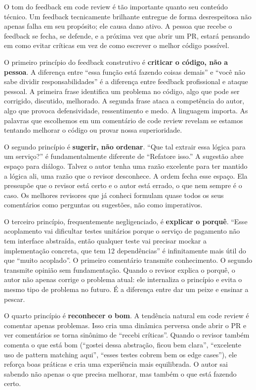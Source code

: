 O tom do feedback em code review é tão importante quanto seu conteúdo técnico. Um
feedback tecnicamente brilhante entregue de forma desrespeitosa não apenas falha em
seu propósito; ele causa dano ativo. A pessoa que recebe o feedback se fecha, se
defende, e a próxima vez que abrir um PR, estará pensando em como evitar críticas
em vez de como escrever o melhor código possível.

O primeiro princípio do feedback construtivo é \textbf{criticar o código, não a
pessoa}. A diferença entre ``essa função está fazendo coisas demais'' e ``você não
sabe dividir responsabilidades'' é a diferença entre feedback profissional e ataque
pessoal. A primeira frase identifica um problema no código, algo que pode ser
corrigido, discutido, melhorado. A segunda frase ataca a competência do autor,
algo que provoca defensividade, ressentimento e medo. A linguagem importa. As
palavras que escolhemos em um comentário de code review revelam se estamos tentando
melhorar o código ou provar nossa superioridade.

O segundo princípio é \textbf{sugerir, não ordenar}. ``Que tal extrair essa lógica
para um serviço?'' é fundamentalmente diferente de ``Refatore isso.'' A sugestão
abre espaço para diálogo. Talvez o autor tenha uma razão excelente para ter mantido
a lógica ali, uma razão que o revisor desconhece. A ordem fecha esse espaço. Ela
pressupõe que o revisor está certo e o autor está errado, o que nem sempre é o caso.
Os melhores revisores que já conheci formulam quase todos os seus comentários como
perguntas ou sugestões, não como imperativos.

O terceiro princípio, frequentemente negligenciado, é \textbf{explicar o porquê}.
``Esse acoplamento vai dificultar testes unitários porque o serviço de pagamento não
tem interface abstraída, então qualquer teste vai precisar mockar a implementação
concreta, que tem 12 dependências'' é infinitamente mais útil do que ``muito acoplado''.
O primeiro comentário transmite conhecimento. O segundo transmite opinião sem
fundamentação. Quando o revisor explica o porquê, o autor não apenas corrige o
problema atual: ele internaliza o princípio e evita o mesmo tipo de problema no
futuro. É a diferença entre dar um peixe e ensinar a pescar.

O quarto princípio é \textbf{reconhecer o bom}. A tendência natural em code review é
comentar apenas problemas. Isso cria uma dinâmica perversa onde abrir o PR e ver
comentários se torna sinônimo de ``recebi críticas''. Quando o revisor também comenta
o que está bom (``gostei dessa abstração, ficou bem clara'', ``excelente uso de
pattern matching aqui'', ``esses testes cobrem bem os edge cases''), ele reforça boas
práticas e cria uma experiência mais equilibrada. O autor sai sabendo não apenas o que
precisa melhorar, mas também o que está fazendo certo.

